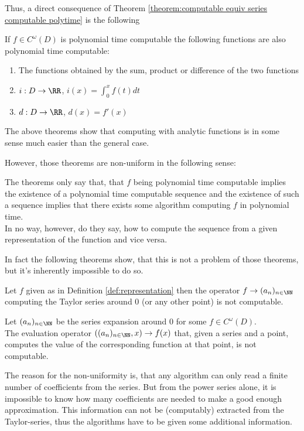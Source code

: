		Thus, a direct consequence of Theorem \ref{theorem:computable equiv series computable polytime} is the following
		\begin{corollary}
			If $f \in C^\omega(D)$ is polynomial time computable the following functions are also polynomial time computable:
			\begin{enumerate}
        \item The functions obtained by the sum, product or difference of the two functions
				\item $i: D \to \RR$, $i(x) = \int_0^x f(t) dt$
				\item $d: D \to \RR$, $d(x) = f'(x)$ 
			\end{enumerate}
		\end{corollary}
		
		The above theorems show that computing with analytic functions is in some sense much easier than the general case.

		However, those theorems are non-uniform in the following sense:

		The theorems only say that, that $f$ being polynomial time computable implies the existence of a polynomial time computable sequence
		and the existence of such a sequence implies that there exists some algorithm computing $f$ in polynomial time. \\
		In no way, however, do they say, how to compute the sequence from a given representation of the function and vice versa.

		In fact the following theorems show, that this is not a problem of those theorems, but it's inherently impossible to do so.
		\begin{theorem}
			Let $f$ given as in Definition \ref{def:representation} then the operator $f \to (a_n)_{n \in \NN}$ computing the Taylor series around $0$ (or any other point) is not computable.
		\end{theorem} 
		\begin{theorem}\label{theorem: evaluation not uniformly computable from powerseries}
			Let $(a_n)_{n \in \NN}$ be the series expansion around $0$ for some $f \in C^\omega(D)$.\\
			The evaluation operator $((a_n)_{n \in \NN}, x) \to f(x)$ that, given a series and a point, computes the value of the corresponding function at that point, is not computable.
		\end{theorem} 

		The reason for the non-uniformity is, that any algorithm can only read a finite number of 
		coefficients from the series. But from the power series alone, it is impossible to know how many coefficients are needed to make
		a good enough approximation. This information can not be (computably) extracted from the Taylor-series, thus the algorithms have to 
    be given some additional information.

